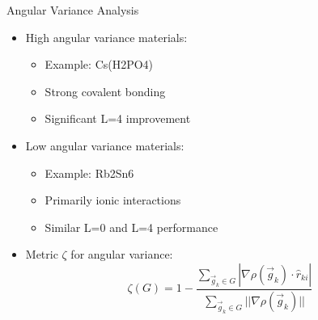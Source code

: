 \begin{frame}{Angular Variance Analysis}
    \begin{itemize}
        \item High angular variance materials:
        \begin{itemize}
            \item Example: Cs(H2PO4)
            \item Strong covalent bonding
            \item Significant L=4 improvement
        \end{itemize}
        \item Low angular variance materials:
        \begin{itemize}
            \item Example: Rb2Sn6
            \item Primarily ionic interactions
            \item Similar L=0 and L=4 performance
        \end{itemize}
        \item Metric $\zeta$ for angular variance:
        \[
        \zeta(G) = 1 - \frac{\sum_{\vec{g}_k \in G} |\nabla\rho(\vec{g}_k) \cdot \hat{r}_{ki}|}{\sum_{\vec{g}_k \in G} ||\nabla\rho(\vec{g}_k)||}
        \]
    \end{itemize}
\end{frame} 